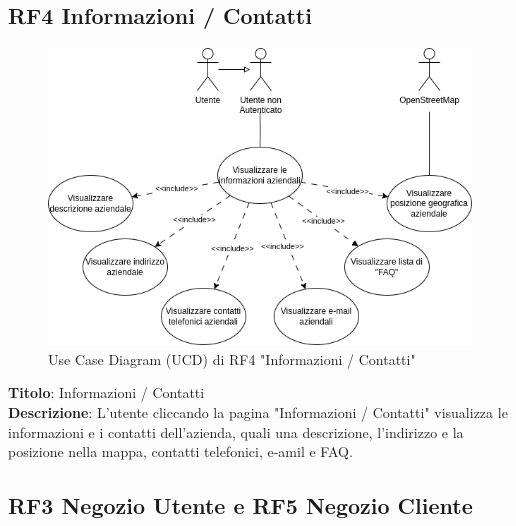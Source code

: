 \documentclass{report}
\begin{document}
\subsection*{RF4 Informazioni / Contatti}

\begin{figure}[H]
	\centering\includegraphics[width=1\textwidth]{images/UCD/RF4_infocontatti_UCD.png}
	Use Case Diagram (UCD) di RF4 "Informazioni / Contatti"
\end{figure}

\textbf{Titolo}: Informazioni / Contatti\\
\textbf{Descrizione}: L'utente cliccando la pagina "Informazioni / Contatti" visualizza le informazioni e i contatti dell'azienda, quali una descrizione, l'indirizzo e la posizione nella mappa, contatti telefonici, e-amil e FAQ.

\subsection*{RF3 Negozio Utente e RF5 Negozio Cliente}
\end{document}

